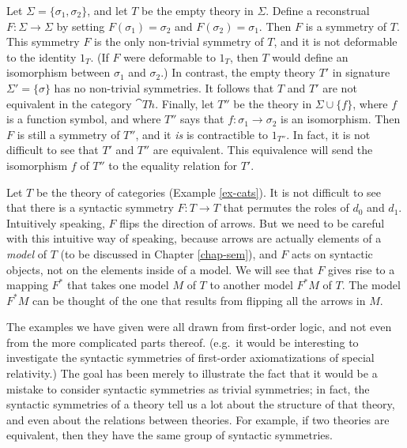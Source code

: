 
\begin{example} Let $\Sigma = \{ \sigma _1,\sigma _2\}$, and let $T$
  be the empty theory in $\Sigma$.  Define a reconstrual
  $F:\Sigma\to\Sigma$ by setting $F(\sigma _1)=\sigma _2$ and
  $F(\sigma _2)=\sigma _1$.  Then $F$ is a symmetry of $T$.  This
  symmetry $F$ is the only non-trivial symmetry of $T$, and it is not
  deformable to the identity $1_T$.  (If $F$ were deformable to $1_T$,
  then $T$ would define an isomorphism between $\sigma _1$ and
  $\sigma _2$.)  In contrast, the empty theory $T'$ in signature
  $\Sigma ' =\{ \sigma \}$ has no non-trivial symmetries.  It follows
  that $T$ and $T'$ are not equivalent in the category $\cat{Th}$.
  Finally, let $T''$ be the theory in $\Sigma \cup \{ f\}$, where $f$
  is a function symbol, and where $T''$ says that
  $f:\sigma _1\to\sigma _2$ is an isomorphism.  Then $F$ is still a
  symmetry of $T''$, and it \textit{is} is contractible to $1_{T''}$.
  In fact, it is not difficult to see that $T'$ and $T''$ are
  equivalent.  This equivalence will send the isomorphism $f$ of $T''$
  to the equality relation for $T'$.  \end{example}



\begin{example} Let $T$ be the theory of categories (Example
  \ref{ex-cats}).  It is not difficult to see that there is a
  syntactic symmetry $F:T\to T$ that permutes the roles of $d_0$ and
  $d_1$.  Intuitively speaking, $F$ flips the direction of arrows.
  But we need to be careful with this intuitive way of speaking,
  because arrows are actually elements of a \textit{model} of $T$ (to
  be discussed in Chapter \ref{chap-sem}), and $F$ acts on syntactic
  objects, not on the elements inside of a model.  We will see that
  $F$ gives rise to a mapping $F^*$ that takes one model $M$ of $T$ to
  another model $F^*M$ of $T$.  The model $F^*M$ can be thought of the
  one that results from flipping all the arrows in $M$.
\end{example}

The examples we have given were all drawn from first-order logic, and
not even from the more complicated parts thereof.  (e.g.\ it would be
interesting to investigate the syntactic symmetries of first-order
axiomatizations of special relativity.)  The goal has been merely to
illustrate the fact that it would be a mistake to consider syntactic
symmetries as trivial symmetries; in fact, the syntactic symmetries of
a theory tell us a lot about the structure of that theory, and even
about the relations between theories.  For example, if two theories
are equivalent, then they have the same group of syntactic symmetries.

